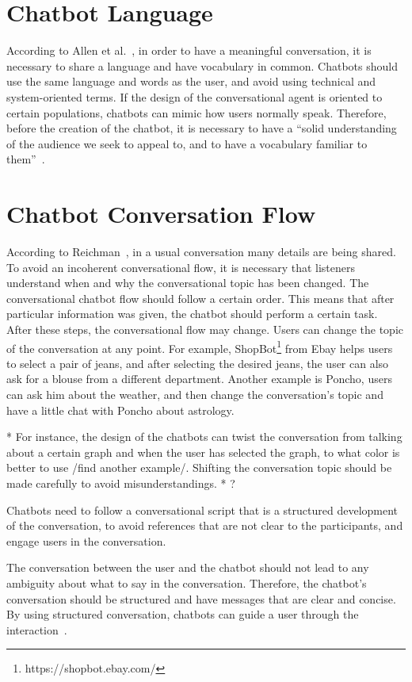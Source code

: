 \documentclass[a4paper,10pt]{article}
\begin{document}
\section{Chatbot Language}
According to Allen et al.~\cite{allen1978conversation}, in order to have a meaningful conversation, it is necessary to share a language and have vocabulary in common. Chatbots should use the same language and words as the user, and avoid using technical and system-oriented terms. If the design of the conversational agent is oriented to certain populations, chatbots can mimic how users normally speak.  Therefore, before the creation of the chatbot, it is necessary to have a ``solid understanding of the audience we seek to appeal to, and to have a vocabulary familiar to them”~\cite{HeuristicsWebPage}. 

\section{Chatbot Conversation Flow}
According to Reichman~\cite{reichman1985getting}, in a usual conversation many details are being shared. To avoid an incoherent conversational flow, it is necessary that listeners understand when and why the conversational topic has been changed. The conversational chatbot flow should follow a certain order. This means that after particular information was given, the chatbot should perform a certain task. After these steps, the conversational flow may change. Users can change the topic of the conversation at any point. For example, ShopBot\footnote{https://shopbot.ebay.com/} from Ebay helps users to select a pair of jeans, and after selecting the desired jeans, the user can also ask for a blouse from a different department. Another example is Poncho, users can ask him about the weather, and then change the conversation's topic and have a little chat with Poncho about astrology. 

* For instance, the design of the chatbots can twist the conversation from talking about a certain graph and when the user has selected the graph, to what color is better to use /find another example/. Shifting the conversation topic should be made carefully to avoid misunderstandings.  * ?

Chatbots need to follow a conversational script that is a structured development of the conversation, to avoid references that are not clear to the participants, and engage users in the conversation.

The conversation between the user and the chatbot should not lead to any ambiguity about what to say in the conversation. Therefore, the chatbot's conversation should be structured and have messages that are clear and concise. By using structured conversation, chatbots can guide a user through the interaction~\cite{HeuristicsWebPage}.
\end{document}
